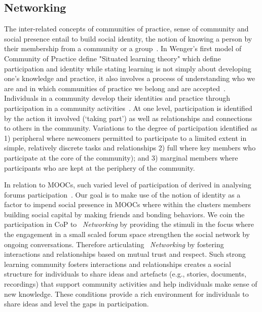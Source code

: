 \documentclass[manuscript,screen,review]{acmart}
\begin{document}
\subsection{Networking} 
The inter-related concepts of communities of practice, sense of community and social presence entail to build social identity, the notion of knowing a person by their membership from a community or a group~\cite{wenger1999communities}. In Wenger's first model of Community of Practice define "Situated learning theory" which define participation and identity while stating learning is not simply
about developing one's knowledge and practice, it also involves a process of understanding who we are and in which communities of practice we belong and are accepted~\cite{wenger1999communities}.  Individuals in a community develop their identities and practice through participation in a community activities~\cite{handley2006within}. At one level, participation is identified by the action it involved (‘taking part’) as well as
relationships and connections to others in the community. Variations to the degree of participation identified as 1) peripheral where newcomers permitted to participate to a limited extent in simple, relatively discrete tasks and relationships 2) full where key members who participate at the core of the community); and 3) marginal members where participants who are kept at the periphery of the community.   

In relation to MOOCs, such varied level of participation of derived in analysing forums participation~\cite{rodrigues2016discovering,ferguson2012social}. Our goal is to make use of the notion of identity as a factor to impend social presence in MOOCs where within the clusters members building social capital by making friends and bonding behaviors. We coin the participation in CoP to ~\textit{Networking} by providing the stimuli in the focus where the engagement in a small scaled forum space strengthen the social network by ongoing conversations. Therefore articulating ~\textit{Networking} by fostering interactions and relationships based on mutual trust and respect. Such strong learning community fosters interactions and relationships creates a social structure for individuals to share ideas and artefacts (e.g., stories, documents, recordings) that support community activities and help individuals make sense of new knowledge. These conditions provide a rich environment for individuals to share ideas and level the gaps in participation.
\end{document}
